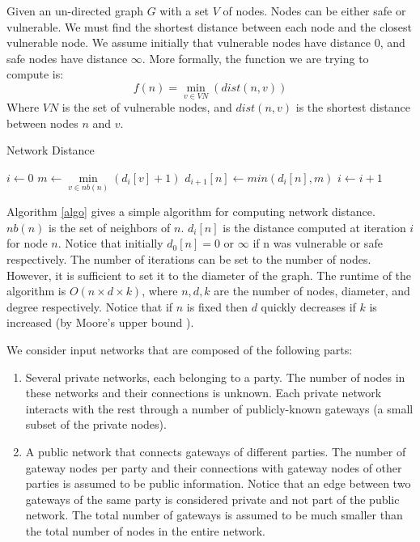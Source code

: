 Given an un-directed graph $G$ with a set $V$ of nodes. Nodes can be either safe or vulnerable. We must find the shortest distance between each node and the closest vulnerable node. We assume initially that vulnerable nodes have distance $0$, and safe nodes have distance $\infty$. More formally, the function we are trying to compute is:
	$$f(n) = \min_{v \in VN}(dist(n,v))$$
Where $VN$ is the set of vulnerable nodes, and $dist(n,v)$ is the shortest distance between nodes $n$ and $v$. \\

\begin{algorithm}
\caption{Network Distance}
\label{algo}

\begin{algorithmic}[1]
\State $i \gets 0$
\State $m \gets \min\limits_{v \in nb(n)}(d_i[v] + 1)$
\State $d_{i+1}[n] \gets min(d_i[n], m)$
\EndFor
\State $i \gets i + 1$
\EndWhile
\end{algorithmic}
\end{algorithm}

Algorithm \ref{algo} gives a simple algorithm for computing network distance. $nb(n)$ is the set of neighbors of $n$. $d_i[n]$ is the distance computed at iteration $i$ for node $n$. Notice that initially $d_0[n] = 0$ or $\infty$ if n was vulnerable or safe respectively. The number of iterations can be set to the number of nodes. However, it is sufficient to set it to the diameter of the graph. The runtime of the algorithm is $O(n \times d \times k)$, where $n,d,k$ are the number of nodes, diameter, and degree respectively. Notice that if $n$ is fixed then $d$ quickly decreases if $k$ is increased (by Moore's upper bound \cite{moore}). \\ \vspace{5mm}

We consider input networks that are composed of the following parts: \begin{enumerate}
\item Several private networks, each belonging to a party. The number of nodes in these networks and their connections is unknown. Each private network interacts with the rest through a number of publicly-known gateways (a small subset of the private nodes).

\item A public network that connects gateways of different parties. The number of gateway nodes per party and their connections with gateway nodes of other parties is assumed to be public information. Notice that an edge between two gateways of the same party is considered private and not part of the public network. The total number of gateways is assumed to be much smaller than the total number of nodes in the entire network.
\end{enumerate}
